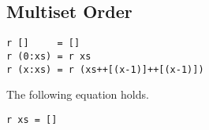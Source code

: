 \subsection{Multiset Order}
\begin{verbatim}
r []     = []
r (0:xs) = r xs
r (x:xs) = r (xs++[(x-1)]++[(x-1)])
\end{verbatim}
\begin{claim}The following equation holds.
\begin{verbatim}
r xs = []
\end{verbatim}
\end{claim}
